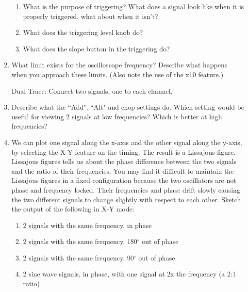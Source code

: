 \documentclass[onecolumn]{article}
\begin{document}
\begin{enumerate}
\begin{enumerate}
\item What is the purpose of triggering? What does a signal look like when it is properly triggered, what about when it isn't?


\item What does the triggering level knob do?


\item What does the slope button in the triggering do?
\end{enumerate}


\item What limit exists for the oscilloscope frequency? Describe what happens when you approach these limits. (Also note the use of the x10 feature.)


\pagebreak 

Dual Trace: Connect two signals, one to each channel. 

\item Describe what the ``Add", ``Alt" and chop settings do. Which setting would be useful for viewing 2 signals at low frequencies? Which is better at high frequencies?



\item We can plot one signal along the x-axis and the other signal along the y-axis, by selecting the X-Y feature on the timing. The result is a Lissajous figure. Lissajous figures tells us about the phase difference between the two signals and the ratio of their frequencies. You may find it difficult to maintain the Lissajous figures in a fixed configuration because the two oscillators are not phase and frequency locked. Their frequencies and phase drift slowly causing the two different signals to change slightly with respect to each other. Sketch the output of the following in X-Y mode:

\begin{enumerate}
\item {2 signals with the same frequency, in phase}
\item {2 signals with the same frequency, 180$^\circ$ out of phase}
\item {2 signals with the same frequency, 90$^\circ$ out of phase}
\item {2 sine wave signals, in phase, with one signal at 2x the frequency (a 2:1 ratio)}
\end{enumerate}



\end{enumerate}
\end{document}

